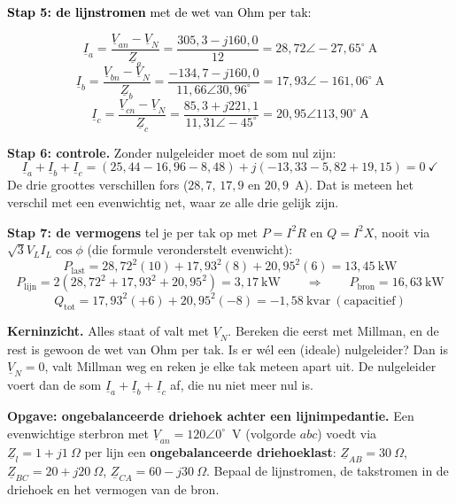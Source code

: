 \documentclass[a4paper,11pt]{article}
\newcommand{\stapreden}[1]{\par\vspace{1.4mm}\noindent\textcolor{black}{#1}\par\vspace{-2mm}}
\begin{document}
\begin{oefenblok}
    \stapreden{\textbf{Stap 5: de lijnstromen} met de wet van Ohm per tak:}
    \[\underline{I}_a = \frac{\underline{V}_{an} - \underline{V}_N}{\underline{Z}_a}
        = \frac{305{,}3 - j160{,}0}{12} = \boxed{28{,}72\angle -27{,}65^\circ\ \text{A}}\]
    \[\underline{I}_b = \frac{\underline{V}_{bn} - \underline{V}_N}{\underline{Z}_b}
        = \frac{-134{,}7 - j160{,}0}{11{,}66\angle 30{,}96^\circ} = \boxed{17{,}93\angle -161{,}06^\circ\ \text{A}}\]
    \[\underline{I}_c = \frac{\underline{V}_{cn} - \underline{V}_N}{\underline{Z}_c}
        = \frac{85{,}3 + j221{,}1}{11{,}31\angle -45^\circ} = \boxed{20{,}95\angle 113{,}90^\circ\ \text{A}}\]

    \textbf{Stap 6: controle.} Zonder nulgeleider moet de som nul zijn:
    \[\underline{I}_a + \underline{I}_b + \underline{I}_c
        = (25{,}44 - 16{,}96 - 8{,}48) + j(-13{,}33 - 5{,}82 + 19{,}15) = 0\ \checkmark\]
    De drie groottes verschillen fors ($28{,}7$, $17{,}9$ en $20{,}9$~A). Dat is meteen het verschil
    met een evenwichtig net, waar ze alle drie gelijk zijn.

    \textbf{Stap 7: de vermogens} tel je per tak op met $P = I^2R$ en $Q = I^2X$, nooit via
    $\sqrt3 V_L I_L\cos\phi$ (die formule veronderstelt evenwicht):
    \[P_{\text{last}} = 28{,}72^2(10) + 17{,}93^2(8) + 20{,}95^2(6) = 13{,}45\ \text{kW}\]
    \[P_{\text{lijn}} = 2\left(28{,}72^2 + 17{,}93^2 + 20{,}95^2\right) = 3{,}17\ \text{kW}
        \qquad\Longrightarrow\qquad P_{\text{bron}} = \boxed{16{,}63\ \text{kW}}\]
    \[Q_{\text{tot}} = 17{,}93^2(+6) + 20{,}95^2(-8) = \boxed{-1{,}58\ \text{kvar}}\ (\text{capacitief})\]

    \textbf{Kerninzicht.} Alles staat of valt met $\underline{V}_N$. Bereken die eerst met Millman,
    en de rest is gewoon de wet van Ohm per tak. Is er w\'el een (ideale) nulgeleider? Dan is
    $\underline{V}_N = 0$, valt Millman weg en reken je elke tak meteen apart uit. De nulgeleider
    voert dan de som $\underline{I}_a + \underline{I}_b + \underline{I}_c$ af, die nu niet meer nul
    is.
\end{oefenblok}

\textbf{Opgave: ongebalanceerde driehoek achter een lijnimpedantie.} Een evenwichtige sterbron met
$\underline{V}_{an} = 120\angle 0^\circ$~V (volgorde $abc$) voedt via $\underline{Z}_l = 1+j1\ \Omega$
per lijn een \textbf{ongebalanceerde driehoeklast}: $\underline{Z}_{AB} = 30\ \Omega$,
$\underline{Z}_{BC} = 20+j20\ \Omega$, $\underline{Z}_{CA} = 60-j30\ \Omega$. Bepaal de lijnstromen,
de takstromen in de driehoek en het vermogen van de bron.
\end{document}
